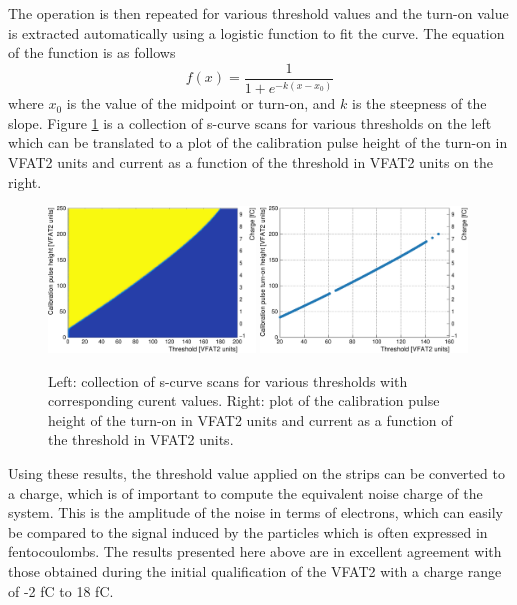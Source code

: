      The operation is then repeated for various threshold values and the turn-on value is extracted automatically using a logistic function to fit the curve. The equation of the function is as follows
      \begin{equation}
        f(x) = \frac{1}{1 + e^{-k \left( x - x_0 \right)}}
      \end{equation}
      where $ x_0 $ is the value of the midpoint or turn-on, and $ k $ is the steepness of the slope. Figure \ref{fig:II-5-scurves} is a collection of s-curve scans for various thresholds on the left which can be translated to a plot of the calibration pulse height of the turn-on in VFAT2 units and current as a function of the threshold in VFAT2 units on the right. \\

      \begin{figure}[h!]
        \centering
        \includegraphics[width=0.49\textwidth]{img/plots/cSCurve_ThresholdVCal-crop}
        \includegraphics[width=0.49\textwidth]{img/plots/cSCurve_TurnOn-crop}
        \caption{Left: collection of s-curve scans for various thresholds with corresponding curent values. Right: plot of the calibration pulse height of the turn-on in VFAT2 units and current as a function of the threshold in VFAT2 units.}
        \label{fig:II-5-scurves}
      \end{figure}

      Using these results, the threshold value applied on the strips can be converted to a charge, which is of important to compute the equivalent noise charge of the system. This is the amplitude of the noise in terms of electrons, which can easily be compared to the signal induced by the particles which is often expressed in fentocoulombs. The results presented here above are in excellent agreement with those obtained during the initial qualification of the VFAT2 \cite{Aspell:1267947} with a charge range of -2 fC to 18 fC.

